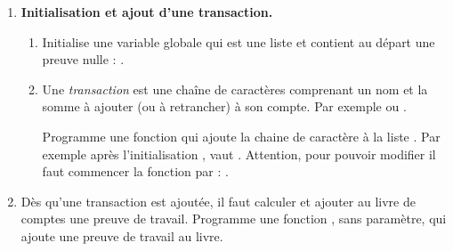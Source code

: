 \documentclass[11pt,class=report,crop=false]{standalone}
\begin{document}
\begin{activite}




\begin{enumerate}
  \item \textbf{Initialisation et ajout d'une transaction.}
  
  \begin{enumerate}
    \item Initialise une variable globale  qui est une liste et contient au départ une preuve nulle :  .
  
    \item Une \emph{transaction} est une chaîne de caractères comprenant un nom et la somme à ajouter (ou à retrancher) à son compte. Par exemple  ou .
    
    Programme une fonction  qui ajoute la chaine de caractère  à la liste . 
Par exemple après l'initialisation ,  
     vaut \ci{[ [0, 0, 0, 0, 0, 0], "Camille +100" ]}.
    Attention, pour pouvoir modifier  il faut commencer la fonction par : .
    
  \end{enumerate} 
  
   \item Dès qu'une transaction est ajoutée, il faut calculer et ajouter au livre de comptes une preuve de travail. Programme une fonction , sans paramètre, qui ajoute une preuve de travail au livre.   
   

\end{enumerate}
\end{activite}
\end{document}
